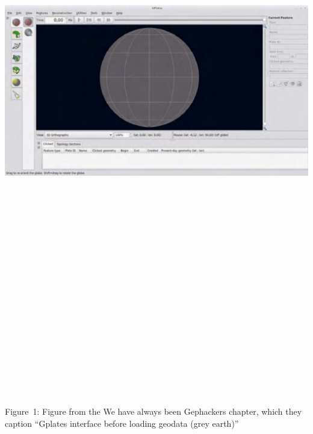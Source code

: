 \includegraphics[width=18.65278in,height=10.52778in]{./media_03_Disobedient_Action_Research_Cycles/Pictures/0.png}

Figure~1: Figure from the We have always been Gephackers chapter, which
they caption ``Gplates interface before loading geodata (grey earth)''

